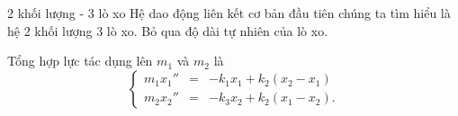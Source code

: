 \begin{frame}{2 khối lượng - 3 lò xo}
    Hệ dao động liên kết cơ bản đầu tiên chúng ta tìm hiểu là hệ 2 khối lượng 3 lò xo. Bỏ qua độ dài tự nhiên của lò xo.
    \vspace{2mm}
    \begin{center}
        \scalebox{1}{}
    \end{center}
    Tổng hợp lực tác dụng lên $m_1$ và $m_2$ là
    \begin{equation}
    \left\{
    \begin{array}{ccc}
    m_1 x_1'' &=& - k_1 x_1 + k_2 (x_2 - x_1) \\
    m_2 x_2'' &=& - k_3 x_2 + k_2 (x_1 - x_2).
    \end{array}
    \right.
    \label{eq:3.1_1}
    \end{equation}
\end{frame}

